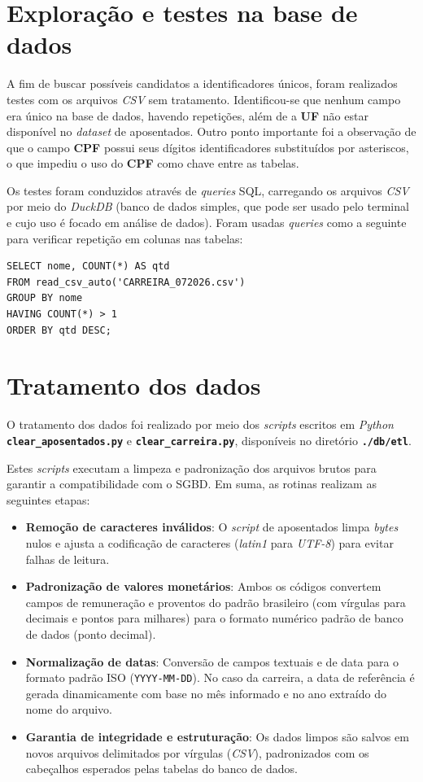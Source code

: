 \documentclass[12pt,a4paper]{article}
\begin{document}
\section{Exploração e testes na base de dados}

A fim de buscar possíveis candidatos a identificadores únicos, foram realizados testes com os arquivos \textit{CSV} sem tratamento. Identificou-se que nenhum campo era único na base de dados, havendo repetições, além de a \textbf{UF} não estar disponível no \textit{dataset} de aposentados. Outro ponto importante foi a observação de que o campo \textbf{CPF} possui seus dígitos identificadores substituídos por asteriscos, o que impediu o uso do \textbf{CPF} como chave entre as tabelas.

Os testes foram conduzidos através de \textit{queries} SQL, carregando os arquivos \textit{CSV} por meio do \textit{DuckDB} (banco de dados simples, que pode ser usado pelo terminal e cujo uso é focado em análise de dados). Foram usadas \textit{queries} como a seguinte para verificar repetição em colunas nas tabelas:

\begin{lstlisting}
SELECT nome, COUNT(*) AS qtd
FROM read_csv_auto('CARREIRA_072026.csv')
GROUP BY nome
HAVING COUNT(*) > 1
ORDER BY qtd DESC;
\end{lstlisting}

\section{Tratamento dos dados}
O tratamento dos dados foi realizado por meio dos \textit{scripts} escritos em \textit{Python} \textbf{\texttt{clear\_aposentados.py}} e \textbf{\texttt{clear\_carreira.py}}, disponíveis no diretório \textbf{\texttt{./db/etl}}.

Estes \textit{scripts} executam a limpeza e padronização dos arquivos brutos para garantir a compatibilidade com o SGBD. Em suma, as rotinas realizam as seguintes etapas:
\begin{itemize}
    \item \textbf{Remoção de caracteres inválidos}: O \textit{script} de aposentados limpa \textit{bytes} nulos e ajusta a codificação de caracteres (\textit{latin1} para \textit{UTF-8}) para evitar falhas de leitura.
    \item \textbf{Padronização de valores monetários}: Ambos os códigos convertem campos de remuneração e proventos do padrão brasileiro (com vírgulas para decimais e pontos para milhares) para o formato numérico padrão de banco de dados (ponto decimal).
    \item \textbf{Normalização de datas}: Conversão de campos textuais e de data para o formato padrão ISO (\texttt{YYYY-MM-DD}). No caso da carreira, a data de referência é gerada dinamicamente com base no mês informado e no ano extraído do nome do arquivo.
    \item \textbf{Garantia de integridade e estruturação}: Os dados limpos são salvos em novos arquivos delimitados por vírgulas (\textit{CSV}), padronizados com os cabeçalhos esperados pelas tabelas do banco de dados.
\end{itemize}
\end{document}

